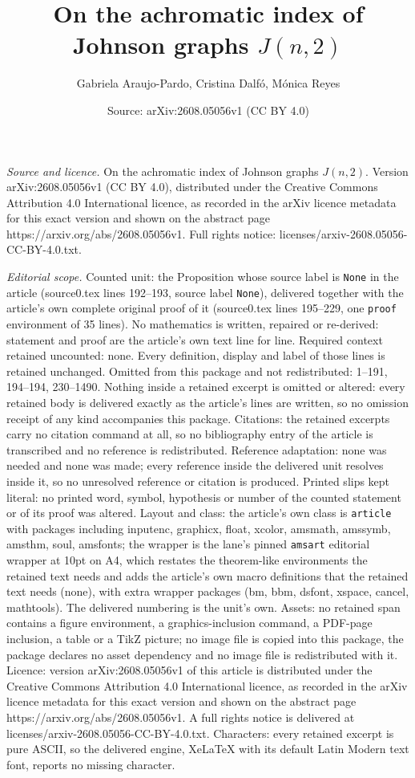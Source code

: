 \documentclass[10pt,a4paper]{amsart}
\title[On the achromatic index of Johnson graphs $J(n,2)$]{On the achromatic index of Johnson graphs $J(n,2)$}
\author{Gabriela Araujo-Pardo, Cristina Dalf\'o, M\'onica Reyes}
\date{Source: arXiv:2608.05056v1 (CC BY 4.0)}
\begin{document}
\maketitle

\noindent\emph{Source and licence.} On the achromatic index of Johnson graphs $J(n,2)$. Version arXiv:2608.05056v1 (CC BY 4.0), distributed under the Creative Commons Attribution 4.0 International licence, as recorded in the arXiv licence metadata for this exact version and shown on the abstract page https://arxiv.org/abs/2608.05056v1. Full rights notice: licenses/arxiv-2608.05056-CC-BY-4.0.txt.\par\smallskip

\noindent\textit{Editorial scope.} Counted unit: the Proposition whose source label is \texttt{None} in the article (source0.tex lines 192--193, source label \texttt{None}), delivered together with the article's own complete original proof of it (source0.tex lines 195--229, one \texttt{proof} environment of 35 lines). No mathematics is written, repaired or re-derived: statement and proof are the article's own text line for line. Required context retained uncounted: none. Every definition, display and label of those lines is retained unchanged. Omitted from this package and not redistributed: 1--191, 194--194, 230--1490. Nothing inside a retained excerpt is omitted or altered: every retained body is delivered exactly as the article's lines are written, so no omission receipt of any kind accompanies this package. Citations: the retained excerpts carry no citation command at all, so no bibliography entry of the article is transcribed and no reference is redistributed. Reference adaptation: none was needed and none was made; every reference inside the delivered unit resolves inside it, so no unresolved reference or citation is produced. Printed slips kept literal: no printed word, symbol, hypothesis or number of the counted statement or of its proof was altered. Layout and class: the article's own class is \texttt{article} with packages including inputenc, graphicx, float, xcolor, amsmath, amssymb, amsthm, soul, amsfonts; the wrapper is the lane's pinned \texttt{amsart} editorial wrapper at 10pt on A4, which restates the theorem-like environments the retained text needs and adds the article's own macro definitions that the retained text needs (none), with extra wrapper packages (bm, bbm, dsfont, xspace, cancel, mathtools). The delivered numbering is the unit's own. Assets: no retained span contains a figure environment, a graphics-inclusion command, a PDF-page inclusion, a table or a TikZ picture; no image file is copied into this package, the package declares no asset dependency and no image file is redistributed with it. Licence: version arXiv:2608.05056v1 of this article is distributed under the Creative Commons Attribution 4.0 International licence, as recorded in the arXiv licence metadata for this exact version and shown on the abstract page https://arxiv.org/abs/2608.05056v1. A full rights notice is delivered at licenses/arxiv-2608.05056-CC-BY-4.0.txt. Characters: every retained excerpt is pure ASCII, so the delivered engine, XeLaTeX with its default Latin Modern text font, reports no missing character.
\end{document}
